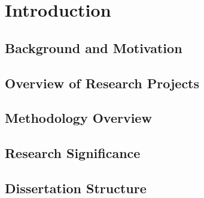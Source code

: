 \chapter{Introduction}
    \section{Background and Motivation}
    \section{Overview of Research Projects}
    \section{Methodology Overview}
    \section{Research Significance}
    \section{Dissertation Structure}
